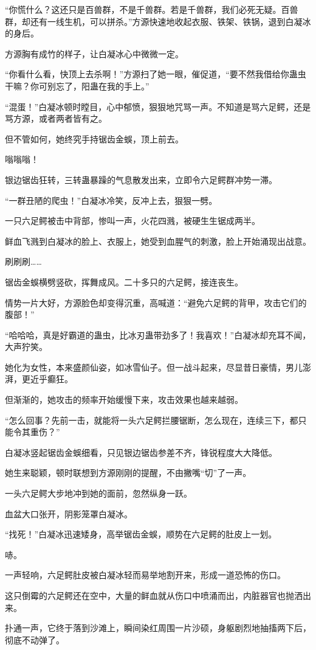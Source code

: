 \begin{this_body}
“你慌什么？这还只是百兽群，不是千兽群。若是千兽群，我们必死无疑。百兽群，却还有一线生机，可以拼杀。”方源快速地收起衣服、铁架、铁锅，退到白凝冰的身后。

方源胸有成竹的样子，让白凝冰心中微微一定。

“你看什么看，快顶上去杀啊！”方源扫了她一眼，催促道，“要不然我借给你蛊虫干嘛？你可别忘了，阳蛊在我的手上。”

“混蛋！”白凝冰顿时瞠目，心中郁愤，狠狠地咒骂一声。不知道是骂六足鳄，还是骂方源，或者两者皆有之。

但不管如何，她终究手持锯齿金蜈，顶上前去。

嗡嗡嗡！

银边锯齿狂转，三转蛊暴躁的气息散发出来，立即令六足鳄群冲势一滞。

“一群丑陋的爬虫！”白凝冰冷笑，反冲上去，狠狠一劈。

一只六足鳄被击中背部，惨叫一声，火花四溅，被硬生生锯成两半。

鲜血飞溅到白凝冰的脸上、衣服上，她受到血腥气的刺激，脸上开始涌现出战意。

刷刷刷……

锯齿金蜈横劈竖砍，挥舞成风。二十多只的六足鳄，接连丧生。

情势一片大好，方源脸色却变得沉重，高喊道：“避免六足鳄的背甲，攻击它们的腹部！”

“哈哈哈，真是好霸道的蛊虫，比冰刃蛊带劲多了！我喜欢！”白凝冰却充耳不闻，大声狞笑。

她化为女性，本来盛颜仙姿，如冰雪仙子。但一战斗起来，尽显昔日豪情，男儿澎湃，更近乎癫狂。

但渐渐的，她攻击的频率开始缓慢下来，攻击效果也越来越弱。

“怎么回事？先前一击，就能将一头六足鳄拦腰锯断，怎么现在，连续三下，都只能令其重伤？”

白凝冰竖起锯齿金蜈细看，只见银边锯齿参差不齐，锋锐程度大大降低。

她生来聪颖，顿时联想到方源刚刚的提醒，不由撇嘴“切”了一声。

一头六足鳄大步地冲到她的面前，忽然纵身一跃。

血盆大口张开，阴影笼罩白凝冰。

“找死！”白凝冰迅速矮身，高举锯齿金蜈，顺势在六足鳄的肚皮上一划。

哧。

一声轻响，六足鳄肚皮被白凝冰轻而易举地割开来，形成一道恐怖的伤口。

这只倒霉的六足鳄还在空中，大量的鲜血就从伤口中喷涌而出，内脏器官也抛洒出来。

扑通一声，它终于落到沙滩上，瞬间染红周围一片沙硕，身躯剧烈地抽搐两下后，彻底不动弹了。


\end{this_body}
